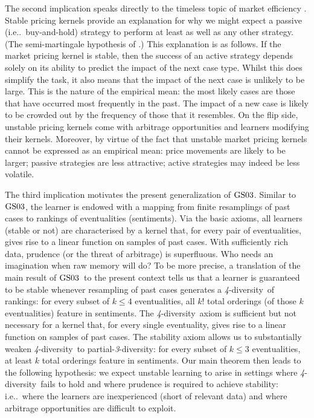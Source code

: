 \documentclass[ecta,nameyear,draft]{econsocart}
\makeatletter
\newcommand{\parthreediv}{\textup{partial-\textit{3}-diversity}}
\newcommand{\fourdiv}{\textit{4}-\textup{diversity}}
\newcommand\ie{i\@.e\@ifnextchar.{}{.\@}}
\newcommand{\gsii}{$\textup{GS03}$}
\theoremstyle{plain}
\theoremstyle{remark}
\makeatother
\begin{document}
 
The second implication speaks directly to the timeless topic of market
efficiency \citet{fama1970efficient,malkiel2003efficient}.  Stable pricing
kernels provide an explanation for why we might expect a passive (\ie\
buy-and-hold) strategy to perform at least as well as any other strategy.  (The
semi-martingale hypothesis of \citet{fama1970efficient}.) This explanation is
as follows. If the market pricing kernel is stable, then the success of an
active strategy depends solely on its ability to predict the impact of the next
case type.  Whilst this does simplify the task, it also means that the impact
of the next case is unlikely to be large. This is the nature of the empirical
mean: the most likely cases are those that have occurred most frequently in the
past. The impact of a new case is likely to be crowded out by the frequency of
those that it resembles.  On the flip side, unstable pricing kernels come with
arbitrage opportunities and learners modifying their kernels.  Moreover, by
virtue of the fact that unstable market pricing kernels cannot be expressed as
an empirical mean: price movements are likely to be larger; passive strategies
are less attractive; active strategies may indeed be less volatile.

The third implication motivates the present generalization of \gsii. Similar
to \gsii, the learner is endowed with a mapping from finite resamplings of past
cases to rankings of eventualities (sentiments).  Via the basic axioms, all
learners (stable or not) are characterised by a kernel that, for every pair of
eventualities, gives rise to a linear function on samples of past cases.
With sufficiently rich data, prudence (or the threat of arbitrage) is
superfluous. Who needs an imagination when raw memory will do? To be more
precise, a translation of the main result of \gsii\ to the present context
tells us that a learner is guaranteed to be stable whenever resampling of past
cases generates a \fourdiv\ of rankings: for every subset of $k \leq 4$
eventualities, all $k!$ total orderings (of those $k$ eventualities) feature in
{sentiments}.  The \fourdiv\ axiom is sufficient but not necessary for a kernel
that, for every single eventuality, gives rise to a linear function on samples
of past cases. The stability axiom allows us to substantially weaken \fourdiv\
to \parthreediv:
for every subset of $k \leq 3$ eventualities, at least $k$
total orderings feature in {sentiments}.
Our main theorem then leads to the
following hypothesis: we expect unstable learning to arise in settings where
\fourdiv\ fails to hold and where prudence is required to achieve stability:
\ie\ where the learners are inexperienced (short of relevant data) and where
arbitrage opportunities are difficult to exploit.
\end{document}
